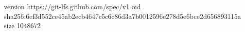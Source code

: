 version https://git-lfs.github.com/spec/v1
oid sha256:6ef3d552ce45ab2ecb4647c5c6c86d3a7b0012596e278d5e6bce2d656893115a
size 1048672
